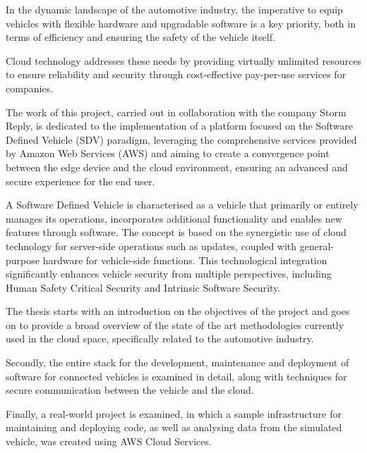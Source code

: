 \sommario

In the dynamic landscape of the automotive industry, the imperative to equip vehicles with flexible hardware and upgradable software is a key priority, both in terms of efficiency and ensuring the safety of the vehicle itself.

Cloud technology addresses these needs by providing virtually unlimited resources to ensure reliability and security through cost-effective pay-per-use services for companies.

The work of this project, carried out in collaboration with the company Storm Reply, is dedicated to the implementation of a platform focused on the Software Defined Vehicle (SDV) paradigm, leveraging the comprehensive services provided by Amazon Web Services (AWS) and aiming to create a convergence point between the edge device and the cloud environment, ensuring an advanced and secure experience for the end user.

A Software Defined Vehicle is characterised as a vehicle that primarily or entirely manages its operations, incorporates additional functionality and enables new features through software. The concept is based on the synergistic use of cloud technology for server-side operations such as updates, coupled with general-purpose hardware for vehicle-side functions. This technological integration significantly enhances vehicle security from multiple perspectives, including Human Safety Critical Security and Intrinsic Software Security.

The thesis starts with an introduction on the objectives of the project and goes on to provide a broad overview of the state of the art methodologies currently used in the cloud space, specifically related to the automotive industry.

Secondly, the entire stack for the development, maintenance and deployment of software for connected vehicles is examined in detail, along with techniques for secure communication between the vehicle and the cloud.

Finally, a real-world project is examined, in which a sample infrastructure for maintaining and deploying code, as well as analysing data from the simulated vehicle, was created using AWS Cloud Services.

